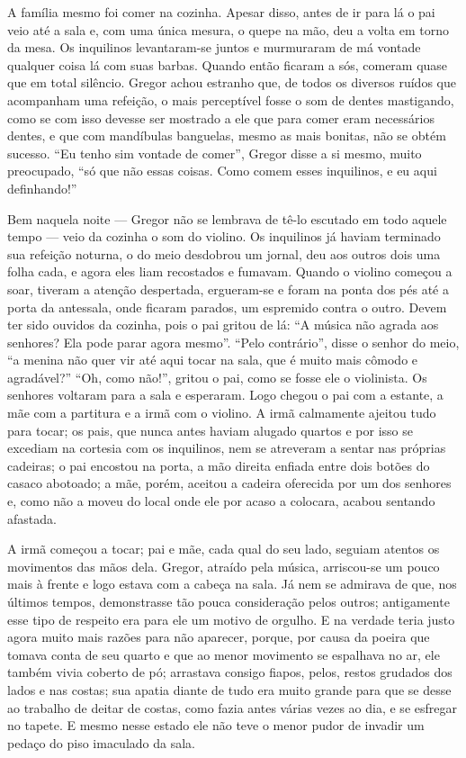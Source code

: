 A família mesmo foi comer na cozinha. Apesar disso, antes de ir para lá o
pai veio até a sala e, com uma única mesura, o quepe na mão, deu a volta
em torno da mesa. Os inquilinos levantaram-se juntos e murmuraram de má
vontade qualquer coisa lá com suas barbas. Quando então ficaram a sós,
comeram quase que em total silêncio. Gregor achou estranho que, de todos
os diversos ruídos que acompanham uma refeição, o mais perceptível fosse o
som de dentes mastigando, como se com isso devesse ser mostrado a ele que
para comer eram necessários dentes, e que com mandíbulas banguelas, mesmo
as mais bonitas, não se obtém sucesso. “Eu tenho sim vontade de comer”,
Gregor disse a si mesmo, muito preocupado, “só que não essas
coisas. Como comem esses inquilinos, e eu aqui definhando!”

Bem naquela noite --- Gregor não se lembrava de tê-lo escutado em todo
aquele tempo --- veio da cozinha o som do violino. Os inquilinos já haviam
terminado sua refeição noturna, o do meio desdobrou um jornal, deu aos
outros dois uma folha cada, e agora eles liam recostados e fumavam. Quando
o violino começou a soar, tiveram a atenção despertada, ergueram-se e
foram na ponta dos pés até a porta da antessala, onde ficaram parados, um
espremido contra o outro. Devem ter sido ouvidos da cozinha, pois o pai
gritou de lá: “A música não agrada aos senhores? Ela pode parar agora
mesmo”. “Pelo contrário”, disse o senhor do meio, “a menina não quer vir
até aqui tocar na sala, que é muito mais cômodo e agradável?” “Oh, como
não!”, gritou o pai, como se fosse ele o violinista. Os senhores voltaram
para a sala e esperaram. Logo chegou o pai com a estante, a mãe com a
partitura e a irmã com o violino. A irmã calmamente ajeitou tudo para
tocar; os pais, que nunca antes haviam alugado quartos e por isso se
excediam na cortesia com os inquilinos, nem se atreveram a sentar nas
próprias cadeiras; o pai encostou na porta, a mão direita enfiada entre
dois botões do casaco abotoado; a mãe, porém, aceitou a cadeira oferecida
por um dos senhores e, como não a moveu do local onde ele por acaso a
colocara, acabou sentando afastada.

A irmã começou a tocar; pai e mãe, cada qual do seu lado, seguiam atentos
os movimentos das mãos dela. Gregor, atraído pela música, arriscou-se um
pouco mais à frente e logo estava com a cabeça na sala. Já nem se admirava
de que, nos últimos tempos, demonstrasse tão pouca consideração pelos
outros; antigamente esse tipo de respeito era para ele um motivo de
orgulho. E na verdade teria justo agora muito mais razões para não
aparecer, porque, por causa da poeira que tomava conta de seu quarto e que
ao menor movimento se espalhava no ar, ele também vivia coberto de pó;
arrastava consigo fiapos, pelos, restos grudados dos lados e nas costas;
sua apatia diante de tudo era muito grande para que se desse ao trabalho
de deitar de costas, como fazia antes várias vezes ao dia, e se esfregar
no tapete. E mesmo nesse estado ele não teve o menor pudor de invadir um
pedaço do piso imaculado da sala.

